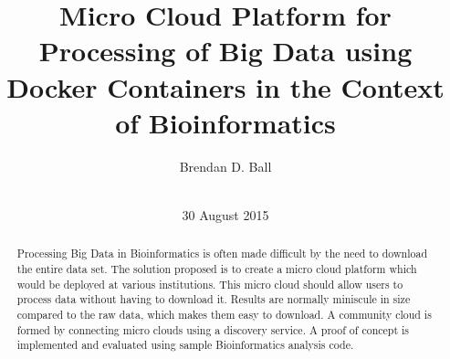 \documentclass{sig-alternate-05-2015}
\begin{document}


\title{Micro Cloud Platform for Processing of Big Data using Docker Containers in the Context of Bioinformatics}

\author{
\alignauthor
Brendan D. Ball\\
       \\
}

\date{30 August 2015}


\maketitle
\begin{abstract}
Processing Big Data in Bioinformatics is often made difficult by the need to download the entire data set. The solution proposed is to create a micro cloud platform which would be deployed at various institutions. This micro cloud should allow users to process data without having to download it. Results are normally miniscule in size compared to the raw data, which makes them easy to download. A community cloud is formed by connecting micro clouds using a discovery service. A proof of concept is implemented and evaluated using sample Bioinformatics analysis code.
\end{abstract}
\end{document}
